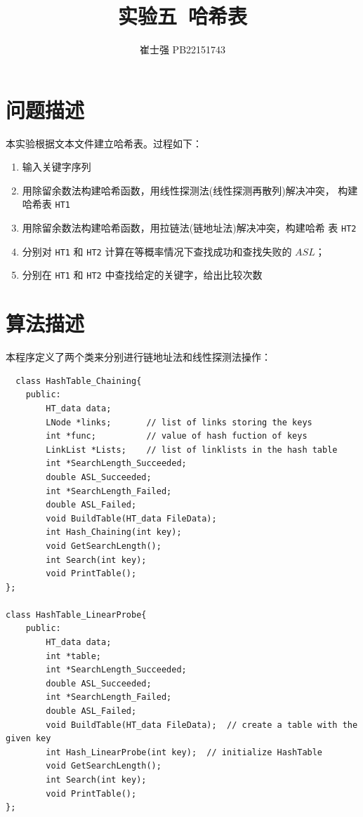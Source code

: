\documentclass[UTF8]{ctexart}
\title{实验五\ 哈希表}
\author{崔士强 PB22151743}
\date{}
\begin{document}
\maketitle

\section{问题描述}
本实验根据文本文件建立哈希表。过程如下：
\begin{enumerate}
  \item 输入关键字序列
  \item 用除留余数法构建哈希函数，用线性探测法(线性探测再散列)解决冲突，
  构建哈希表 \lstinline{HT1}
  \item 用除留余数法构建哈希函数，用拉链法(链地址法)解决冲突，构建哈希
  表 \lstinline{HT2} 
  \item 分别对 \lstinline{HT1} 和 \lstinline{HT2} 计算在等概率情况下查找成功和查找失败的 $ASL$；
  \item 分别在 \lstinline{HT1} 和 \lstinline{HT2} 中查找给定的关键字，给出比较次数
\end{enumerate}

\section{算法描述}
本程序定义了两个类来分别进行链地址法和线性探测法操作：
\begin{lstlisting}
  class HashTable_Chaining{
    public:
        HT_data data;
        LNode *links;       // list of links storing the keys
        int *func;          // value of hash fuction of keys
        LinkList *Lists;    // list of linklists in the hash table
        int *SearchLength_Succeeded;
        double ASL_Succeeded;
        int *SearchLength_Failed;
        double ASL_Failed;
        void BuildTable(HT_data FileData);
        int Hash_Chaining(int key);
        void GetSearchLength();
        int Search(int key);
        void PrintTable();
};

class HashTable_LinearProbe{
    public:
        HT_data data;
        int *table;
        int *SearchLength_Succeeded;
        double ASL_Succeeded;
        int *SearchLength_Failed;
        double ASL_Failed;
        void BuildTable(HT_data FileData);  // create a table with the given key
        int Hash_LinearProbe(int key);  // initialize HashTable 
        void GetSearchLength();
        int Search(int key);
        void PrintTable();
};
\end{lstlisting}
\end{document}
